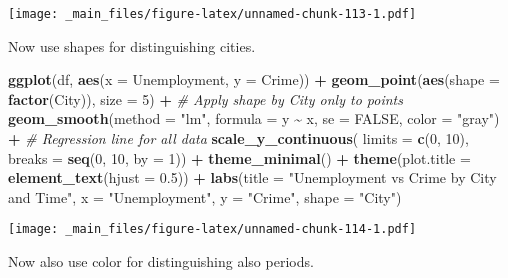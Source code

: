 \documentclass[
]{book}
\newenvironment{Shaded}{\begin{snugshade}}{\end{snugshade}}
\newcommand{\AttributeTok}[1]{\textcolor[rgb]{0.13,0.29,0.53}{#1}}
\newcommand{\CommentTok}[1]{\textcolor[rgb]{0.56,0.35,0.01}{\textit{#1}}}
\newcommand{\ConstantTok}[1]{\textcolor[rgb]{0.56,0.35,0.01}{#1}}
\newcommand{\DecValTok}[1]{\textcolor[rgb]{0.00,0.00,0.81}{#1}}
\newcommand{\FloatTok}[1]{\textcolor[rgb]{0.00,0.00,0.81}{#1}}
\newcommand{\FunctionTok}[1]{\textcolor[rgb]{0.13,0.29,0.53}{\textbf{#1}}}
\newcommand{\NormalTok}[1]{#1}
\newcommand{\SpecialCharTok}[1]{\textcolor[rgb]{0.81,0.36,0.00}{\textbf{#1}}}
\newcommand{\StringTok}[1]{\textcolor[rgb]{0.31,0.60,0.02}{#1}}
\begin{document}
\texttt{[image: \_main\_files/figure-latex/unnamed-chunk-113-1.pdf]}

Now use shapes for distinguishing cities.

\begin{Shaded}
\begin{Highlighting}[]
\FunctionTok{ggplot}\NormalTok{(df, }\FunctionTok{aes}\NormalTok{(}\AttributeTok{x =}\NormalTok{ Unemployment, }\AttributeTok{y =}\NormalTok{ Crime)) }\SpecialCharTok{+}
  \FunctionTok{geom\_point}\NormalTok{(}\FunctionTok{aes}\NormalTok{(}\AttributeTok{shape =} \FunctionTok{factor}\NormalTok{(City)), }\AttributeTok{size =} \DecValTok{5}\NormalTok{) }\SpecialCharTok{+}  \CommentTok{\# Apply shape by City only to points}
  \FunctionTok{geom\_smooth}\NormalTok{(}\AttributeTok{method =} \StringTok{"lm"}\NormalTok{, }\AttributeTok{formula =}\NormalTok{ y }\SpecialCharTok{\textasciitilde{}}\NormalTok{ x, }\AttributeTok{se =} \ConstantTok{FALSE}\NormalTok{, }\AttributeTok{color =} \StringTok{"gray"}\NormalTok{) }\SpecialCharTok{+}  \CommentTok{\# Regression line for all data}
  \FunctionTok{scale\_y\_continuous}\NormalTok{(}
    \AttributeTok{limits =} \FunctionTok{c}\NormalTok{(}\DecValTok{0}\NormalTok{, }\DecValTok{10}\NormalTok{),}
    \AttributeTok{breaks =} \FunctionTok{seq}\NormalTok{(}\DecValTok{0}\NormalTok{, }\DecValTok{10}\NormalTok{, }\AttributeTok{by =} \DecValTok{1}\NormalTok{)) }\SpecialCharTok{+}
  \FunctionTok{theme\_minimal}\NormalTok{() }\SpecialCharTok{+}
  \FunctionTok{theme}\NormalTok{(}\AttributeTok{plot.title =} \FunctionTok{element\_text}\NormalTok{(}\AttributeTok{hjust =} \FloatTok{0.5}\NormalTok{)) }\SpecialCharTok{+}
  \FunctionTok{labs}\NormalTok{(}\AttributeTok{title =} \StringTok{"Unemployment vs Crime by City and Time"}\NormalTok{,}
       \AttributeTok{x =} \StringTok{"Unemployment"}\NormalTok{,}
       \AttributeTok{y =} \StringTok{"Crime"}\NormalTok{,}
       \AttributeTok{shape =} \StringTok{"City"}\NormalTok{)}
\end{Highlighting}
\end{Shaded}

\texttt{[image: \_main\_files/figure-latex/unnamed-chunk-114-1.pdf]}

Now also use color for distinguishing also periods.
\end{document}
